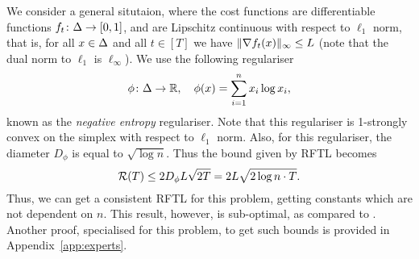 We consider a general situtaion, where the cost functions are differentiable functions $f_t\colon \Delta \to [0,1]$, and are Lipschitz continuous with respect to $\ell_1$ norm, that is, for all $x\in\Delta$ and all $t\in[T]$ we have $\| \nabla f_t(x) \|_\infty \leq L$ (note that the dual norm to $\ell_1$ is  $\ell_\infty$). We use the following regulariser
\[
    \phi\colon \Delta\to\mathbb{R},\quad \phi(x) = \sum_{i=1}^n x_i\log x_i,
\]
known as the \emph{negative entropy} regulariser. Note that this regulariser is 1-strongly convex on the simplex with respect to $\ell_1$ norm. Also, for this regulariser, the diameter $D_\phi$ is equal to $\sqrt{\log n}$. Thus the bound given by RFTL becomes
\[
    \mathcal{R}(T) \leq 2D_\phi L \sqrt{2T} = 2L\sqrt{2\log n\cdot T}.
\]
Thus, we can get a consistent RFTL for this problem, getting constants which are not dependent on $n$. This result, however, is sub-optimal, as compared to \citet{altschuler2018online}.
Another proof, specialised for this problem, to get such bounds is provided in Appendix~\ref{app:experts}.
